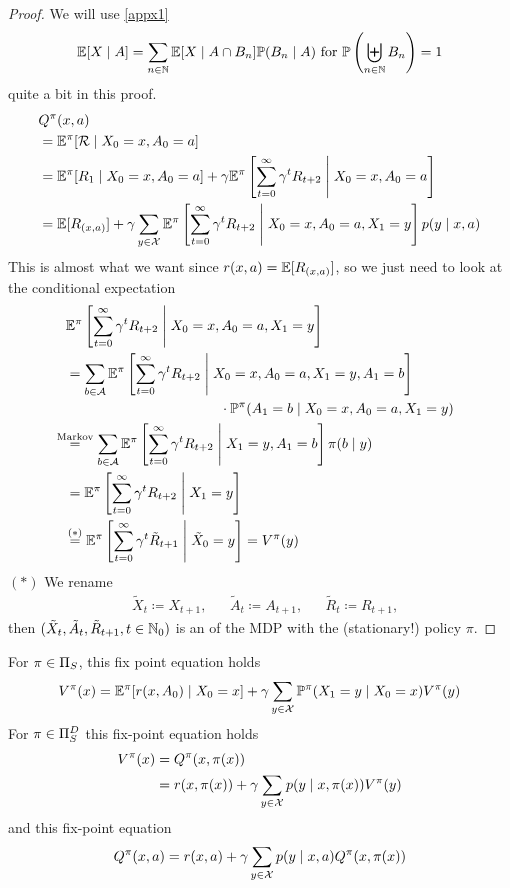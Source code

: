 \begin{proof} We will use \ref{appx1}
	\[
		\mathbb{E}[X\mid A]=\sum_{n\in\mathbb{N}} \mathbb{E}[X\mid A \cap B_n] \mathbb{P}(B_n \mid A) 
		\text{ for }\mathbb{P}\left(\biguplus_{n\in\mathbb{N}}B_n\right)=1 
	\]
	quite a bit in this proof.
\begin{align*}
&Q^\pi(x,a) \\
&= \mathbb{E}^\pi[\mathcal{R}\mid X_0=x, A_0=a]\\
&=\mathbb{E}^\pi[R_1\mid X_0=x,A_0=a]
+\gamma\mathbb{E}^\pi\left[\sum_{t=0}^\infty\gamma^t R_{t+2}\;\middle|\; X_0=x,A_0=a\right]\\
&=\mathbb{E}[R_{(x,a)}] 
 + \gamma \sum_{y\in\mathcal{X}}\mathbb{E}^\pi\left[\sum_{t=0}^\infty\gamma^t R_{t+2} \;\middle|\; X_0=x,A_0=a, X_1=y\right]p(y\mid x, a)\\
\end{align*}
This is almost what we want since \(r(x,a)=\mathbb{E}[R_{(x,a)}] \), so we just need to look at the conditional expectation
\begin{align*}
	&\E^\pi\left[\sum_{t=0}^\infty\gamma^t R_{t+2} \;\middle|\; X_0=x,A_0=a, X_1=y\right]\\
	&=\sum_{b\in\cA}
	\begin{aligned}[t]
	&\E^\pi\left[\sum_{t=0}^\infty\gamma^t R_{t+2} 
	\;\middle|\; X_0=x,A_0=a, X_1=y,A_1=b \right]\\
	&\qquad\qquad\qquad\qquad\cdot \Pr^\pi(A_1=b \mid X_0=x,A_0=a, X_1=y) 
	\end{aligned}
	\\
	&\lxeq{\text{Markov}} 
	\sum_{b\in\cA}\E^\pi\left[\sum_{t=0}^\infty\gamma^t R_{t+2} \;\middle|\; X_1=y,A_1=b \right]
	\pi(b\mid y)\\
	&= \E^\pi\left[\sum_{t=0}^\infty\gamma^t R_{t+2}\;\middle|\; X_1=y \right] \\
 	&\lxeq{(*)} \E^\pi\left[\sum_{t=0}^\infty\gamma^t \tilde{R}_{t+1}\;\middle|\; \tilde{X}_0=y \right]=V^\pi(y)
\end{align*}
\((*)\) We rename 
\begin{align*}
	&\tilde{X}_{t}\coloneqq X_{t+1}, && \tilde{A}_t\coloneqq A_{t+1},
	&&\tilde{R}_{t}\coloneqq R_{t+1},
\end{align*}
then \((\tilde{X}_t,\tilde{A}_t,\tilde{R}_{t+1}, t\in\mathbb{N}_0)\) is an  of the MDP with the (stationary!) policy \(\pi\).
\end{proof}

\begin{corollary}\label{V^pi,Q^pi relation} 
For \(\pi\in\Pi_S\), this fix point equation holds
\[
	V^\pi(x) = \mathbb{E}^\pi[r(x,A_0)\mid X_0=x] 
	+ \gamma \sum_{y\in\mathcal{X}} \mathbb{P}^\pi(X_1=y \mid X_0=x) V^\pi(y)
\]	
For \(\pi\in\Pi_S^D\) this fix-point equation holds 
\begin{align*}
	V^\pi(x)&=Q^\pi(x,\pi(x))\\
	 &=r(x,\pi(x))+\gamma\sum\limits_{y\in\mathcal{X}}p(y\mid x,\pi(x))V^\pi(y)
\end{align*}
and this fix-point equation
\[
	Q^\pi(x,a)=r(x,a)+\gamma\sum_{y\in\mathcal{X}}p(y\mid x,a)Q^\pi(x,\pi(x))
\]
\end{corollary}

